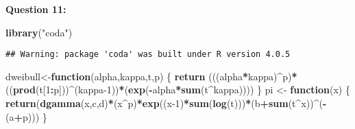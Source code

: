 \documentclass[
]{article}
\newenvironment{Shaded}{\begin{snugshade}}{\end{snugshade}}
\newcommand{\ControlFlowTok}[1]{\textcolor[rgb]{0.13,0.29,0.53}{\textbf{#1}}}
\newcommand{\DecValTok}[1]{\textcolor[rgb]{0.00,0.00,0.81}{#1}}
\newcommand{\KeywordTok}[1]{\textcolor[rgb]{0.13,0.29,0.53}{\textbf{#1}}}
\newcommand{\NormalTok}[1]{#1}
\newcommand{\OperatorTok}[1]{\textcolor[rgb]{0.81,0.36,0.00}{\textbf{#1}}}
\newcommand{\StringTok}[1]{\textcolor[rgb]{0.31,0.60,0.02}{#1}}
\begin{document}
\textbf{Question 11:}

\begin{Shaded}
\begin{Highlighting}[]
\KeywordTok{library}\NormalTok{(}\StringTok{"coda"}\NormalTok{)}
\end{Highlighting}
\end{Shaded}

\begin{verbatim}
## Warning: package 'coda' was built under R version 4.0.5
\end{verbatim}

\begin{Shaded}
\begin{Highlighting}[]
\NormalTok{dweibull<-}\ControlFlowTok{function}\NormalTok{(alpha,kappa,t,p)}
\NormalTok{\{}
  \KeywordTok{return}\NormalTok{ (((alpha}\OperatorTok{*}\NormalTok{kappa)}\OperatorTok{^}\NormalTok{p)}\OperatorTok{*}\NormalTok{((}\KeywordTok{prod}\NormalTok{(t[}\DecValTok{1}\OperatorTok{:}\NormalTok{p]))}\OperatorTok{^}\NormalTok{(kappa}\DecValTok{-1}\NormalTok{))}\OperatorTok{*}\NormalTok{(}\KeywordTok{exp}\NormalTok{(}\OperatorTok{-}\NormalTok{alpha}\OperatorTok{*}\KeywordTok{sum}\NormalTok{(t}\OperatorTok{^}\NormalTok{kappa))))}
\NormalTok{\}}
\NormalTok{pi <-}\StringTok{ }\ControlFlowTok{function}\NormalTok{(x)}
\NormalTok{\{}
  \KeywordTok{return}\NormalTok{(}\KeywordTok{dgamma}\NormalTok{(x,c,d)}\OperatorTok{*}\NormalTok{(x}\OperatorTok{^}\NormalTok{p)}\OperatorTok{*}\KeywordTok{exp}\NormalTok{((x}\DecValTok{-1}\NormalTok{)}\OperatorTok{*}\KeywordTok{sum}\NormalTok{(}\KeywordTok{log}\NormalTok{(t)))}\OperatorTok{*}\NormalTok{(b}\OperatorTok{+}\KeywordTok{sum}\NormalTok{(t}\OperatorTok{^}\NormalTok{x))}\OperatorTok{^}\NormalTok{(}\OperatorTok{-}\NormalTok{(a}\OperatorTok{+}\NormalTok{p)))}
\NormalTok{\}}


\end{Highlighting}
\end{Shaded}
\end{document}
